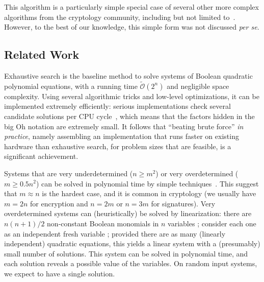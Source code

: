 \documentclass[a4paper,UKenglish,cleveref, autoref]{lipics-v2019}
\newcommand{\bigOsoft}[1]{\ensuremath{\mathcal{\tilde O}\left( #1 \right)} }
\begin{document}
This algorithm is a particularly simple special case of several other more
complex algorithms from the cryptology community, including but not limited
to~\cite{CourtoisKPS00,BettaleFP09,JouxV17}. However, to the best of our
knowledge, this simple form was not discussed \textit{per se}.


\subsection{Related Work}
\label{sec:related}

Exhaustive search is the baseline method to solve systems of Boolean quadratic
polynomial equations, with a running time $\bigOsoft{2^n}$ and negligible space
complexity. Using several algorithmic tricks and low-level optimizations, it can
be implemented extremely efficiently: serious implementations check several
candidate solutions per CPU cycle~\cite{BouillaguetCCCNSY10}, which means that
the factors hidden in the big Oh notation are extremely small. It follows that
``beating brute force'' \emph{in practice}, namely assembling an implementation
that runs faster on existing hardware than exhaustive search, for problem sizes
that are feasible, is a significant achievement.

Systems that are very underdetermined ($n \geq m^2$) or very overdetermined
($m \geq 0.5 n^2$) can be solved in polynomial time by simple
techniques~\cite{CourtoisGMT02}. This suggest that $m \approx n$ is the hardest
case, and it is common in cryptology (we usually have $m=2n$ for encryption and
$n = 2m$ or $n=3m$ for signatures). Very overdetermined systems can
(heuristically) be solved by linearization: there are $n(n+1)/2$ non-constant
Boolean monomials in $n$ variables ; consider each one as an independent fresh
variable ; provided there are as many (linearly independent) quadratic
equations, this yields a linear system with a (presumably) small number of
solutions. This system can be solved in polynomial time, and each solution
reveals a possible value of the variables. On random input systems, we expect to
have a single solution.
\end{document}
